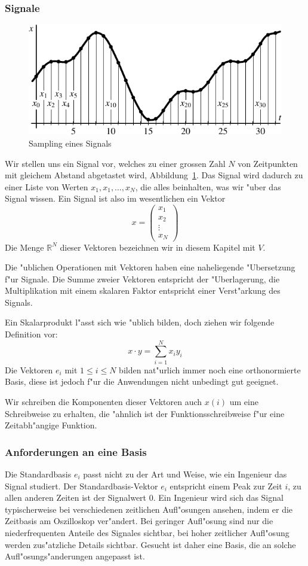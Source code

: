 \subsubsection{Signale}
\begin{figure}
\begin{center}
\includegraphics[width=0.9\hsize]{images/signal-1}
\end{center}
\caption{Sampling eines Signals\label{signal:vector}}
\end{figure}
Wir stellen uns ein Signal vor, welches zu einer grossen Zahl $N$
von Zeitpunkten mit gleichem Abstand abgetastet wird,
Abbildung~\ref{signal:vector}. Das Signal
wird dadurch zu einer Liste von Werten $x_1,x_1,\dots,x_N$, die
alles beinhalten, was wir "uber das Signal wissen. Ein Signal
ist also im wesentlichen ein Vektor
$$
x=\begin{pmatrix}x_1\\x_2\\\vdots\\x_N\end{pmatrix}
$$
Die Menge $\mathbb R^N$ dieser Vektoren bezeichnen wir in diesem
Kapitel mit $V$. 

Die "ublichen Operationen mit Vektoren haben eine naheliegende
"Ubersetzung f"ur Signale. Die Summe zweier Vektoren entspricht
der "Uberlagerung, die Multiplikation mit einem skalaren Faktor
entspricht einer Verst"arkung des Signals. 

Ein Skalarprodukt l"asst sich wie "ublich bilden, doch ziehen
wir folgende Definition vor:
$$
x\cdot y=\sum_{i=1}^Nx_iy_i
$$
Die Vektoren $e_i$ mit $1\le i\le N$ bilden nat"urlich immer noch
eine orthonormierte Basis, diese ist jedoch f"ur die Anwendungen
nicht unbedingt gut geeignet.

Wir schreiben die Komponenten dieser Vektoren auch $x(i)$ um
eine Schreibweise zu erhalten, die "ahnlich ist der Funktionsschreibweise
f"ur eine Zeitabh"angige Funktion.

\subsubsection{Anforderungen an eine Basis}
Die Standardbasis $e_i$ passt nicht zu der Art und Weise, wie ein
Ingenieur das Signal studiert. Der Standardbasis-Vektor $e_i$
entspricht einem Peak zur Zeit $i$, zu allen anderen Zeiten
ist der Signalwert $0$.
Ein Ingenieur wird sich das Signal
typischerweise bei verschiedenen zeitlichen Aufl"osungen
ansehen, indem er die Zeitbasis am Oszilloskop ver"andert.
Bei geringer Aufl"osung sind nur die niederfrequenten
Anteile des Signales sichtbar, bei hoher zeitlicher Aufl"osung
werden zus"atzliche Details sichtbar.
Gesucht ist daher eine Basis, die an solche Aufl"osungs"anderungen
angepasst ist.

